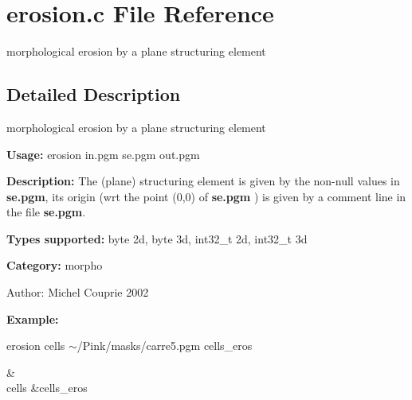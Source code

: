 \section{erosion.c File Reference}
\label{erosion_8c}
morphological erosion by a plane structuring element  




\label{_details}
\subsection{Detailed Description}
morphological erosion by a plane structuring element 

{\bf Usage:} erosion in.pgm se.pgm out.pgm

{\bf Description:} The (plane) structuring element is given by the non-null values in {\bf se.pgm}, its origin (wrt the point (0,0) of {\bf se.pgm} ) is given by a comment line in the file {\bf se.pgm}.

{\bf Types supported:} byte 2d, byte 3d, int32\_\-t 2d, int32\_\-t 3d

{\bf Category:} morpho

\begin{Desc}
\item[Author:]Michel Couprie 2002\end{Desc}
{\bf Example:}

erosion cells $\sim$/Pink/masks/carre5.pgm cells\_\-eros

\begin{TabularC}{2}
\hline
 &  \\
cells &cells\_\-eros  \\
\end{TabularC}

